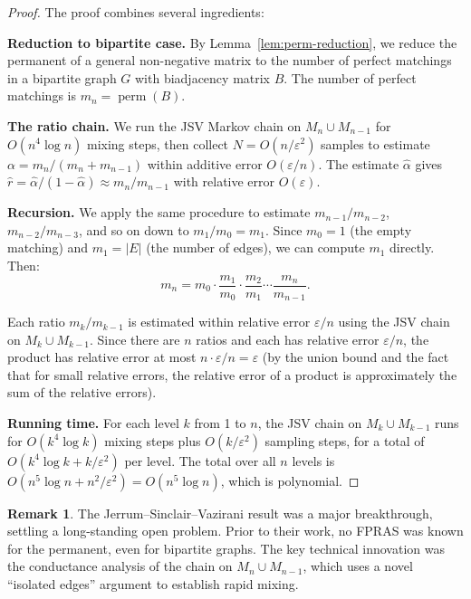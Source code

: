 \documentclass[twoside,12pt]{book}
\theoremstyle{plain}
\theoremstyle{definition}
\newtheorem{remark}[theorem]{Remark}
\theoremstyle{remark}
\begin{document}
\begin{proof}
The proof combines several ingredients:

\textbf{Reduction to bipartite case.} By Lemma~\ref{lem:perm-reduction}, we reduce the permanent of a general non-negative matrix to the number of perfect matchings in a bipartite graph $G$ with biadjacency matrix $B$. The number of perfect matchings is $m_n = \operatorname{perm}(B)$.

\textbf{The ratio chain.} We run the JSV Markov chain on $M_n \cup M_{n-1}$ for $O(n^4 \log n)$ mixing steps, then collect $N = O(n/\varepsilon^2)$ samples to estimate $\alpha = m_n / (m_n + m_{n-1})$ within additive error $O(\varepsilon/n)$. The estimate $\hat{\alpha}$ gives $\hat{r} = \hat{\alpha}/(1 - \hat{\alpha}) \approx m_n/m_{n-1}$ with relative error $O(\varepsilon)$.

\textbf{Recursion.} We apply the same procedure to estimate $m_{n-1}/m_{n-2}$, $m_{n-2}/m_{n-3}$, and so on down to $m_1/m_0 = m_1$. Since $m_0 = 1$ (the empty matching) and $m_1 = |E|$ (the number of edges), we can compute $m_1$ directly. Then:
\[
m_n = m_0 \cdot \frac{m_1}{m_0} \cdot \frac{m_2}{m_1} \cdots \frac{m_n}{m_{n-1}}.
\]

Each ratio $m_k/m_{k-1}$ is estimated within relative error $\varepsilon/n$ using the JSV chain on $M_k \cup M_{k-1}$. Since there are $n$ ratios and each has relative error $\varepsilon/n$, the product has relative error at most $n \cdot \varepsilon/n = \varepsilon$ (by the union bound and the fact that for small relative errors, the relative error of a product is approximately the sum of the relative errors).

\textbf{Running time.} For each level $k$ from 1 to $n$, the JSV chain on $M_k \cup M_{k-1}$ runs for $O(k^4 \log k)$ mixing steps plus $O(k/\varepsilon^2)$ sampling steps, for a total of $O(k^4 \log k + k/\varepsilon^2)$ per level. The total over all $n$ levels is $O(n^5 \log n + n^2/\varepsilon^2) = O(n^5 \log n)$, which is polynomial.
\end{proof}

\begin{remark}
The Jerrum--Sinclair--Vazirani result was a major breakthrough, settling a long-standing open problem. Prior to their work, no FPRAS was known for the permanent, even for bipartite graphs. The key technical innovation was the conductance analysis of the chain on $M_n \cup M_{n-1}$, which uses a novel ``isolated edges'' argument to establish rapid mixing.
\end{remark}
\end{document}
